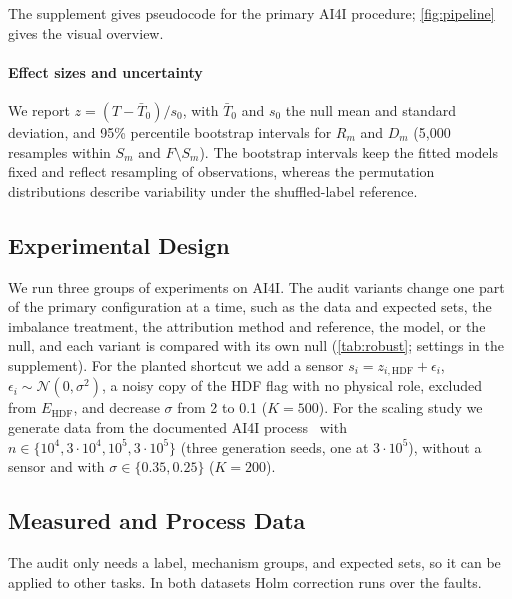 \documentclass[conference]{IEEEtran}
\begin{document}
The supplement gives pseudocode for the primary AI4I procedure; \cref{fig:pipeline} gives the visual overview.



\paragraph{Effect sizes and uncertainty} We report $z=(T-\bar{T}_{0})/s_{0}$, with $\bar{T}_{0}$ and $s_{0}$ the null mean and standard deviation, and 95\% percentile bootstrap intervals for $R_m$ and $D_m$ (5{,}000 resamples within $S_m$ and $F\setminus S_m$). The bootstrap intervals keep the fitted models fixed and reflect resampling of observations, whereas the permutation distributions describe variability under the shuffled-label reference.

\subsection{Experimental Design}
\label{sec:setup}

We run three groups of experiments on AI4I. The audit variants change one part of the primary configuration at a time, such as the data and expected sets, the imbalance treatment, the attribution method and reference, the model, or the null, and each variant is compared with its own null (\cref{tab:robust}; settings in the supplement). For the planted shortcut we add a sensor $s_i=z_{i,\mathrm{HDF}}+\epsilon_i$, $\epsilon_i\sim\mathcal{N}(0,\sigma^2)$, a noisy copy of the HDF flag with no physical role, excluded from $E_{\mathrm{HDF}}$, and decrease $\sigma$ from 2 to 0.1 ($K=500$). For the scaling study we generate data from the documented AI4I process~\cite{matzka2020explainable} with $n\in\{10^4,3\cdot10^4,10^5,3\cdot10^5\}$ (three generation seeds, one at $3\cdot10^5$), without a sensor and with $\sigma\in\{0.35,0.25\}$ ($K=200$).

\subsection{Measured and Process Data}
\label{sec:otherdata}

The audit only needs a label, mechanism groups, and expected sets, so it can be applied to other tasks. In both datasets Holm correction runs over the faults.
\end{document}

